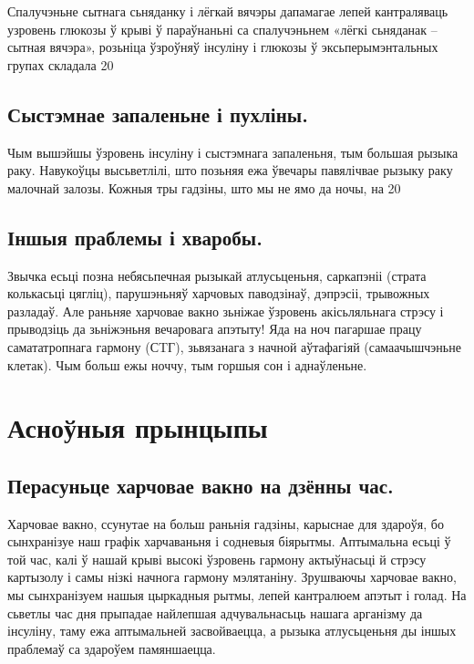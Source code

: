 Спалучэньне сытнага сьняданку і лёгкай вячэры дапамагае лепей кантраляваць узровень глюкозы ў крыві ў параўнаньні са спалучэньнем «лёгкі сьняданак – сытная вячэра», розьніца ўзроўняў інсуліну і глюкозы ў эксьперымэнтальных групах складала 20%

\subsection{Сыстэмнае запаленьне і пухліны.}
Чым вышэйшы ўзровень інсуліну і сыстэмнага запаленьня, тым большая рызыка раку. Навукоўцы высьветлілі, што позьняя ежа ўвечары павялічвае рызыку раку малочнай залозы. Кожныя тры гадзіны, што мы не ямо да ночы, на 20%

\subsection{Іншыя праблемы і хваробы.}
Звычка есьці позна небясьпечная рызыкай атлусьценьня, саркапэніі (страта колькасьці цягліц), парушэньняў харчовых паводзінаў, дэпрэсіі, трывожных разладаў. Але раньняе харчовае вакно зьніжае ўзровень акісьляльнага стрэсу і прыводзіць да зьніжэньня вечаровага апэтыту! Яда на ноч пагаршае працу самататропнага гармону (СTГ), зьвязанага з начной аўтафагіяй (самаачышчэньне клетак). Чым больш ежы ноччу, тым горшыя сон і аднаўленьне.

\section{Асноўныя прынцыпы}

\subsection{Перасуньце харчовае вакно на дзённы час.}
Харчовае вакно, ссунутае на больш раньнія гадзіны, карыснае для здароўя, бо сынхранізуе наш графік харчаваньня і содневыя біярытмы. Аптымальна есьці ў той час, калі ў нашай крыві высокі ўзровень гармону актыўнасьці й стрэсу картызолу і самы нізкі начнога гармону мэлятаніну. Зрушваючы харчовае вакно, мы сынхранізуем нашыя цыркадныя рытмы, лепей кантралюем апэтыт і голад. На сьветлы час дня прыпадае найлепшая адчувальнасьць нашага арганізму да інсуліну, таму ежа аптымальней засвойваецца, а рызыка атлусьценьня ды іншых праблемаў са здароўем памяншаецца.

